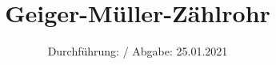 

\subject{V703}
\title{Geiger-Müller-Zählrohr}
\date{%
  Durchführung: /
  \hspace{3em}
  Abgabe: 25.01.2021
}



\maketitle
\thispagestyle{empty}
\tableofcontents
\newpage






\printbibliography{}


